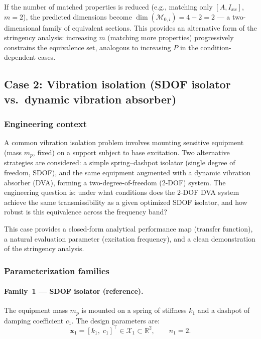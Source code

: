 If the number of matched properties is reduced (e.g., matching only $[A, I_{xx}]$, $m = 2$), the predicted dimensions become $\dim(\mathcal{M}_{0,i}) = 4 - 2 = 2$ --- a two-dimensional family of equivalent sections. This provides an alternative form of the stringency analysis: increasing $m$ (matching more properties) progressively constrains the equivalence set, analogous to increasing $P$ in the condition-dependent cases.


\subsection{Case 2: Vibration isolation (SDOF isolator vs.\ dynamic vibration absorber)}
\label{sec:case_vibration}

\subsubsection{Engineering context}

A common vibration isolation problem involves mounting sensitive equipment (mass $m_p$, fixed) on a support subject to base excitation. Two alternative strategies are considered: a simple spring--dashpot isolator (single degree of freedom, SDOF), and the same equipment augmented with a dynamic vibration absorber (DVA), forming a two-degree-of-freedom (2-DOF) system. The engineering question is: under what conditions does the 2-DOF DVA system achieve the same transmissibility as a given optimized SDOF isolator, and how robust is this equivalence across the frequency band?

This case provides a closed-form analytical performance map (transfer function), a natural evaluation parameter (excitation frequency), and a clean demonstration of the stringency analysis.


\subsubsection{Parameterization families}

\paragraph{Family~1 --- SDOF isolator (reference).}
The equipment mass $m_p$ is mounted on a spring of stiffness $k_1$ and a dashpot of damping coefficient $c_1$. The design parameters are:
\begin{equation}
    \mathbf{x}_1 = [k_1,\; c_1]^\top \in \mathcal{X}_1 \subset \mathbb{R}^2, \qquad n_1 = 2.
    \label{eq:sdof_params}
\end{equation}

